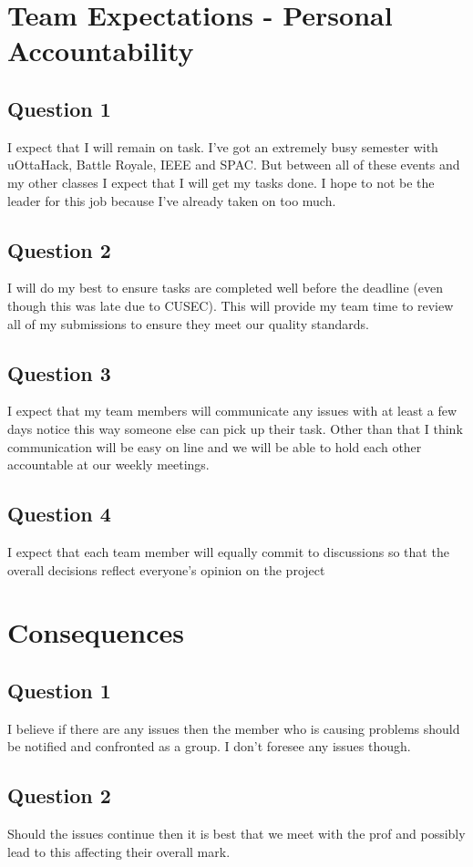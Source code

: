 \documentclass[fleqn, 12pt]{article}
\begin{document}
\section*{Team Expectations - Personal Accountability}

\subsection*{Question 1}

I expect that I will remain on task. I've got an extremely busy semester with uOttaHack, Battle Royale, IEEE and SPAC. But between all of these events and my other classes I expect that I will get my tasks done. I hope to not be the leader for this job because I've already taken on too much.

\subsection*{Question 2}

I will do my best to ensure tasks are completed well before the deadline (even though this was late due to CUSEC). This will provide my team time to review all of my submissions to ensure they meet our quality standards.

\subsection*{Question 3}

I expect that my team members will communicate any issues with at least a few days notice this way someone else can pick up their task. Other than that I think communication will be easy on line and we will be able to hold each other accountable at our weekly meetings.

\subsection*{Question 4}

I expect that each team member will equally commit to discussions so that the overall decisions reflect everyone's opinion on the project

\section*{Consequences}

\subsection*{Question 1}

I believe if there are any issues then the member who is causing problems should be notified and confronted as a group. I don't foresee any issues though.

\subsection*{Question 2}

Should the issues continue then it is best that we meet with the prof and possibly lead to this affecting their overall mark.
\end{document}
